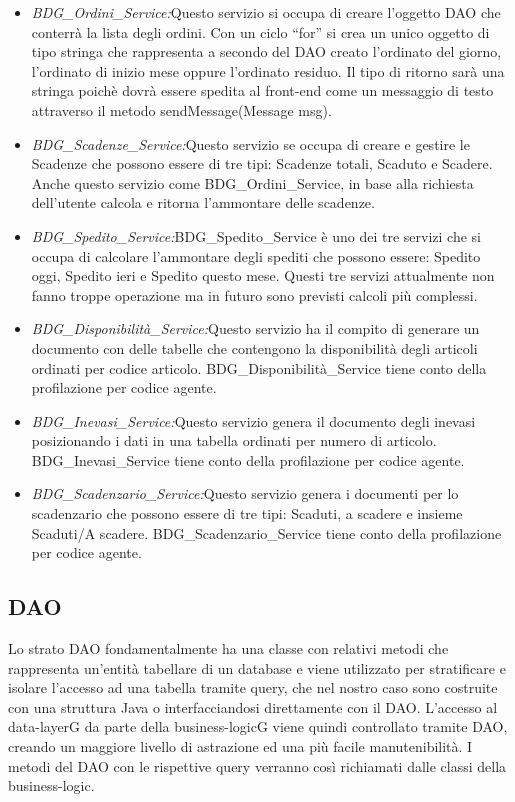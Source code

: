 \begin{itemize}

\item \textit{BDG\_Ordini\_Service:}Questo servizio si occupa di creare l’oggetto DAO che conterrà la lista degli ordini. Con un ciclo “for” si crea un unico oggetto di tipo stringa che rappresenta a secondo del DAO creato l’ordinato del giorno, l’ordinato di inizio mese oppure l’ordinato residuo. Il tipo di ritorno sarà una stringa poichè dovrà essere spedita al front-end come un messaggio di testo attraverso il metodo sendMessage(Message msg).

\item \textit{BDG\_Scadenze\_Service:}Questo servizio se occupa di creare e gestire le Scadenze che possono essere di tre tipi: Scadenze totali, Scaduto e Scadere. Anche questo servizio come BDG\_Ordini\_Service, in base alla richiesta dell’utente calcola e ritorna l’ammontare delle scadenze.

\item \textit{BDG\_Spedito\_Service:}BDG\_Spedito\_Service è uno dei tre servizi che si occupa di calcolare l’ammontare degli spediti che possono essere: Spedito oggi, Spedito ieri e Spedito questo mese. Questi tre servizi attualmente non fanno troppe operazione ma in futuro sono previsti calcoli più complessi.

\item \textit{BDG\_Disponibilità\_Service:}Questo servizio ha il compito di generare un documento con delle tabelle che contengono  la disponibilità degli articoli ordinati per codice articolo. BDG\_Disponibilità\_Service tiene conto della profilazione per codice agente.

\item \textit{BDG\_Inevasi\_Service:}Questo servizio genera il documento degli inevasi posizionando i dati in una tabella ordinati per numero di articolo. BDG\_Inevasi\_Service tiene conto della profilazione per codice agente.

\item \textit{BDG\_Scadenzario\_Service:}Questo servizio genera i documenti per lo scadenzario che possono essere di tre tipi: Scaduti, a scadere e insieme Scaduti/A scadere. BDG\_Scadenzario\_Service tiene conto della profilazione per codice agente.

\end{itemize}

\subsection{DAO}
Lo strato DAO fondamentalmente ha una classe con relativi metodi che rappresenta
un’entità tabellare di un database e viene utilizzato per stratificare e isolare l’accesso
ad una tabella tramite query, che nel nostro caso sono costruite con una struttura Java
o interfacciandosi direttamente con il DAO. L’accesso al data-layerG da parte della
business-logicG viene quindi controllato tramite DAO, creando un maggiore livello di
astrazione ed una più facile manutenibilità. I metodi del DAO con le rispettive query
verranno così richiamati dalle classi della business-logic.


